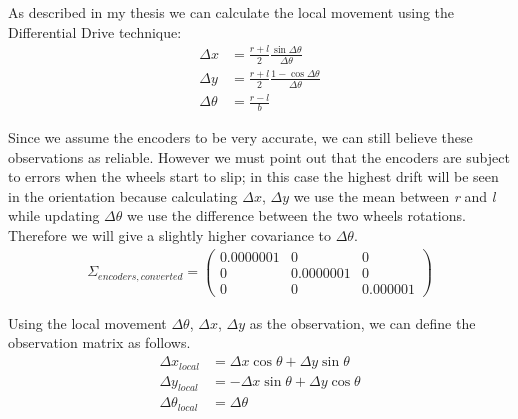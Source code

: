 As described in my thesis\supercite{Graziano:BscThesis:2019} we can calculate the local movement using the Differential Drive technique:
\begin{align}
	\Delta x &= \frac{r + l}{2} \frac{\sin \Delta\theta}{\Delta\theta}\\
	\Delta y &= \frac{r + l}{2} \frac{1 - \cos \Delta\theta}{\Delta\theta}\\
	\Delta\theta &= \frac{r - l}{b}
\end{align}

Since we assume the encoders to be very accurate, we can still believe these observations as reliable. However we must point out that the encoders are subject to errors when the wheels start to slip; in this case the highest drift will be seen in the orientation because calculating $\Delta x$, $\Delta y$ we use the mean between \textit{r} and \textit{l} while updating $\Delta\theta$ we use the difference between the two wheels rotations. Therefore we will give a slightly higher covariance to $\Delta\theta$.
\begin{align}
	\Sigma_{encoders,converted} = \begin{pmatrix}
				0.0000001 & 0 & 0\\
				0 & 0.0000001 & 0\\
				0 & 0 & 0.000001
			\end{pmatrix}
\end{align}

Using the local movement $\Delta\theta$, $\Delta x$, $\Delta y$ as the observation, we can define the observation matrix as follows.
\begin{align}
	\Delta x_{local} &= \Delta x \cos\theta + \Delta y \sin\theta\\
	\Delta y_{local} &= -\Delta x \sin\theta + \Delta y \cos\theta\\
	\Delta\theta_{local} &= \Delta\theta
\end{align}

